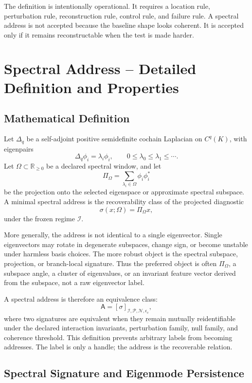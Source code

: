 \documentclass[11pt]{article}
\begin{document}
The definition is intentionally operational. It requires a location rule, perturbation rule, reconstruction rule, control rule, and failure rule. A spectral address is not accepted because the baseline shape looks coherent. It is accepted only if it remains reconstructable when the test is made harder.

\section{Spectral Address -- Detailed Definition and Properties}

\subsection{Mathematical Definition}

Let \(\Delta_q\) be a self-adjoint positive semidefinite cochain Laplacian on \(C^q(K)\), with eigenpairs
\[
\Delta_q\phi_i=\lambda_i\phi_i,
\qquad
0\leq \lambda_0\leq \lambda_1\leq \cdots .
\]
Let \(\Omega\subset\mathbb{R}_{\geq 0}\) be a declared spectral window, and let
\[
\Pi_{\Omega}
=
\sum_{\lambda_i\in\Omega}\phi_i\phi_i^{\ast}
\]
be the projection onto the selected eigenspace or approximate spectral subspace. A minimal spectral address is the recoverability class of the projected diagnostic
\[
\sigma(x;\Omega)=\Pi_{\Omega}x,
\]
under the frozen regime \(\mathcal{I}\).

More generally, the address is not identical to a single eigenvector. Single eigenvectors may rotate in degenerate subspaces, change sign, or become unstable under harmless basis choices. The more robust object is the spectral subspace, projection, or branch-local signature. Thus the preferred object is often \(\Pi_{\Omega}\), a subspace angle, a cluster of eigenvalues, or an invariant feature vector derived from the subspace, not a raw eigenvector label.

A spectral address is therefore an equivalence class:
\[
\mathsf{A}
=
[\sigma]_{\mathcal{I},\mathcal{P},\mathcal{N},\epsilon_c},
\]
where two signatures are equivalent when they remain mutually reidentifiable under the declared interaction invariants, perturbation family, null family, and coherence threshold. This definition prevents arbitrary labels from becoming addresses. The label is only a handle; the address is the recoverable relation.

\subsection{Spectral Signature and Eigenmode Persistence}
\end{document}

